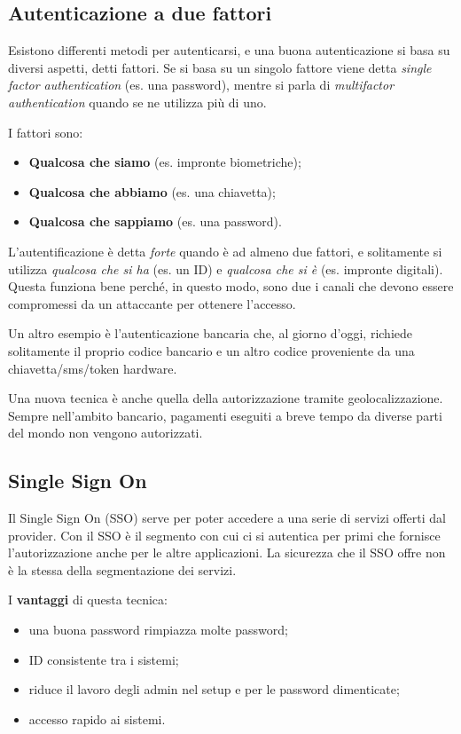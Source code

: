 \subsection{Autenticazione a due fattori}

Esistono differenti metodi per autenticarsi, e una buona autenticazione si 
basa su diversi aspetti, detti fattori. Se si basa su un singolo fattore viene 
detta \textit{single factor authentication} (es. una password), mentre si 
parla di \textit{multifactor authentication} quando se ne utilizza più di uno.

I fattori sono:
\begin{itemize}
 \item \textbf{Qualcosa che siamo} (es. impronte biometriche);
 \item \textbf{Qualcosa che abbiamo} (es. una chiavetta);
 \item \textbf{Qualcosa che sappiamo} (es. una password).
\end{itemize}
L'autentificazione è detta \emph{forte} quando è ad almeno due fattori, e 
solitamente si utilizza \emph{qualcosa che si ha} (es. un ID) e \emph{qualcosa 
che si è} (es. impronte digitali). Questa funziona bene perché, in questo 
modo, sono due i canali che devono essere compromessi da un attaccante per 
ottenere l'accesso.

Un altro esempio è l'autenticazione bancaria che, al giorno d'oggi, richiede
solitamente il proprio codice bancario e un altro codice proveniente da una
chiavetta/sms/token hardware.

Una nuova tecnica è anche quella della autorizzazione tramite
geolocalizzazione. Sempre nell'ambito bancario, pagamenti eseguiti a breve
tempo da diverse parti del mondo non vengono autorizzati.

\subsection{Single Sign On}
Il Single Sign On (SSO) serve per poter accedere a una serie di servizi offerti dal
provider. Con il SSO è il segmento con cui ci si autentica per primi che
fornisce l'autorizzazione anche per le altre applicazioni.
La sicurezza che il SSO offre non è la stessa della segmentazione dei
servizi.

I \textbf{vantaggi} di questa tecnica:
\begin{itemize}
\item una buona password rimpiazza molte password;
\item ID consistente tra i sistemi;
\item riduce il lavoro degli admin nel setup e per le password dimenticate;
\item accesso rapido ai sistemi.
\end{itemize}



